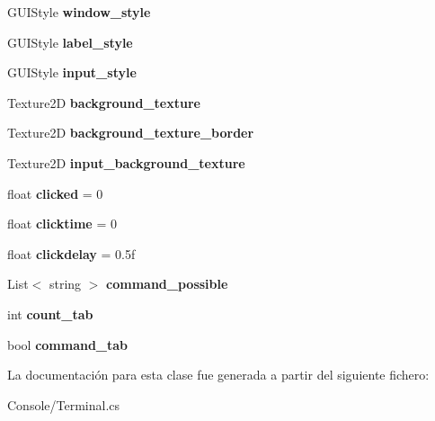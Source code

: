 \begin{DoxyCompactItemize}
\mbox{\label{class_command_terminal_1_1_terminal_a82acce091a03f04c84f8360d984373f5}} 
G\+U\+I\+Style {\bfseries window\+\_\+style}
\item 
\mbox{\label{class_command_terminal_1_1_terminal_a5fae61976b09282118e4b63fba5ae8a0}} 
G\+U\+I\+Style {\bfseries label\+\_\+style}
\item 
\mbox{\label{class_command_terminal_1_1_terminal_a3a8c88225f05affede7c160560c70fe4}} 
G\+U\+I\+Style {\bfseries input\+\_\+style}
\item 
\mbox{\label{class_command_terminal_1_1_terminal_a9f626f22d627748942f2680b5c30ac8f}} 
Texture2D {\bfseries background\+\_\+texture}
\item 
\mbox{\label{class_command_terminal_1_1_terminal_a25fb67f873936e1c05be5ad6319673a9}} 
Texture2D {\bfseries background\+\_\+texture\+\_\+border}
\item 
\mbox{\label{class_command_terminal_1_1_terminal_a40250c4d3456a06b3b75c1e68852c6cc}} 
Texture2D {\bfseries input\+\_\+background\+\_\+texture}
\item 
\mbox{\label{class_command_terminal_1_1_terminal_aeff48012c63fcabb3f11fd14fbaa5e05}} 
float {\bfseries clicked} = 0
\item 
\mbox{\label{class_command_terminal_1_1_terminal_a3b713b4366399e9ac9fb5d657fb63d4e}} 
float {\bfseries clicktime} = 0
\item 
\mbox{\label{class_command_terminal_1_1_terminal_a940b570693f3b01880eb8ccde27d4f03}} 
float {\bfseries clickdelay} = 0.\+5f
\item 
\mbox{\label{class_command_terminal_1_1_terminal_a510c04eb1f384e0305822715f461f0e3}} 
List$<$ string $>$ {\bfseries command\+\_\+possible}
\item 
\mbox{\label{class_command_terminal_1_1_terminal_a05c65b97846b893a2d7fbccc1bd9a7be}} 
int {\bfseries count\+\_\+tab}
\item 
\mbox{\label{class_command_terminal_1_1_terminal_a8da7a3fb5f3d07cf47add7721ac8b726}} 
bool {\bfseries command\+\_\+tab}
\end{DoxyCompactItemize}


La documentación para esta clase fue generada a partir del siguiente fichero\+:\begin{DoxyCompactItemize}
\item 
Console/Terminal.\+cs\end{DoxyCompactItemize}
